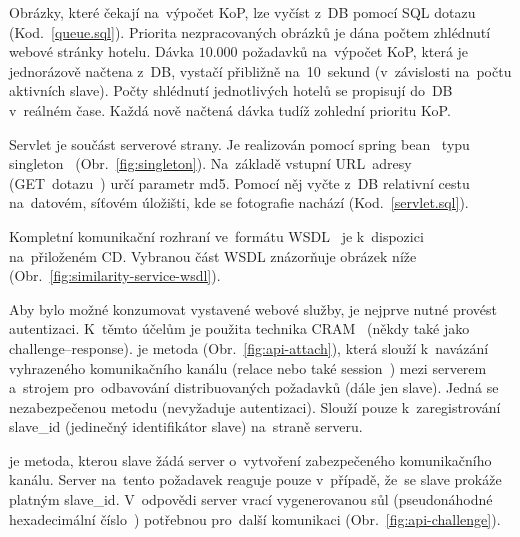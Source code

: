Obrázky, které čekají na~výpočet KoP, lze vyčíst z~DB pomocí SQL dotazu (Kod.~\ref{queue.sql}). Priorita nezpracovaných obrázků je dána počtem zhlédnutí webové stránky hotelu. Dávka $ 10.000 $ požadavků na~výpočet KoP, která je jednorázově načtena z~DB, vystačí přibližně na~10~sekund (v~závislosti na~počtu aktivních slave). Počty shlédnutí jednotlivých hotelů se propisují do~DB v~reálném čase. Každá nově načtená dávka tudíž zohlední prioritu KoP.


Servlet je součást serverové strany. Je realizován pomocí spring bean~\cite{bean} typu singleton~\cite{SpringInAction} (Obr.~\ref{fig:singleton}). Na~základě vstupní URL~adresy~\cite{url} (GET~dotazu~\cite{get}) určí parametr md5. Pomocí něj vyčte z~DB relativní cestu na~datovém, síťovém úložišti, kde se fotografie nachází (Kod.~\ref{servlet.sql}).


Kompletní komunikační rozhraní ve~formátu WSDL~\cite{wsdl} je k~dispozici na~přiloženém CD. Vybranou část WSDL znázorňuje obrázek níže (Obr.~\ref{fig:similarity-service-wsdl}).


Aby bylo možné konzumovat vystavené webové služby, je nejprve nutné provést autentizaci. K~těmto účelům je použita technika CRAM~\cite{challenge-response} (někdy také jako challenge--response).
je metoda (Obr.~\ref{fig:api-attach}), která slouží k~navázání vyhrazeného komunikačního kanálu (relace nebo také session~\cite{session}) mezi serverem a~strojem pro~odbavování distribuovaných požadavků (dále jen slave). Jedná se nezabezpečenou metodu (nevyžaduje autentizaci). Slouží pouze k~zaregistrování slave\_id (jedinečný identifikátor slave) na~straně serveru.


je metoda, kterou slave žádá server o~vytvoření zabezpečeného komunikačního kanálu. Server na~tento požadavek reaguje pouze v~případě, že~se slave prokáže platným slave\_id. V~odpovědi server vrací vygenerovanou sůl (pseudonáhodné hexadecimální číslo~\cite{hash}) potřebnou pro~další komunikaci (Obr.~\ref{fig:api-challenge}).

